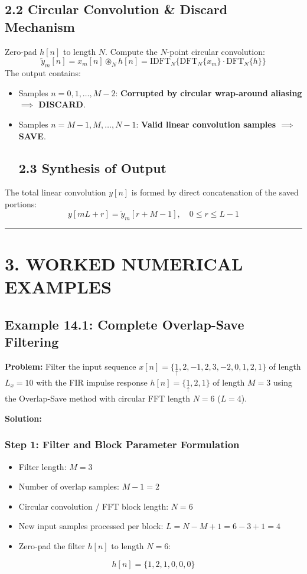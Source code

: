 \documentclass[11pt,a4paper]{article}
\begin{document}
\subsection*{2.2 Circular Convolution \& Discard Mechanism}
Zero-pad $h[n]$ to length $N$. Compute the $N$-point circular convolution:
$$ \tilde{y}_m[n] = x_m[n] \circledast_N h[n] = \text{IDFT}_N\{\text{DFT}_N\{x_m\} \cdot \text{DFT}_N\{h\}\} $$
The output contains:
\begin{itemize}
\item Samples $n = 0, 1, \dots, M-2$: \textbf{Corrupted by circular wrap-around aliasing $\implies$ DISCARD}.
\item Samples $n = M-1, M, \dots, N-1$: \textbf{Valid linear convolution samples $\implies$ SAVE}.

\subsection*{2.3 Synthesis of Output}
\end{itemize}
The total linear convolution $y[n]$ is formed by direct concatenation of the saved portions:
$$ y[mL + r] = \tilde{y}_m[r + M - 1], \quad 0 \le r \le L-1 $$

\noindent\rule{\textwidth}{0.5pt}
\section*{3. WORKED NUMERICAL EXAMPLES}

\subsection*{Example 14.1: Complete Overlap-Save Filtering}
\textbf{Problem:} Filter the input sequence $x[n] = \{ \underset{\uparrow}{1}, 2, -1, 2, 3, -2, 0, 1, 2, 1 \}$ of length $L_x = 10$ with the FIR impulse response $h[n] = \{ \underset{\uparrow}{1}, 2, 1 \}$ of length $M = 3$ using the Overlap-Save method with circular FFT length $N = 6$ ($L = 4$).

\textbf{Solution:}

\subsubsection*{Step 1: Filter and Block Parameter Formulation}
\begin{itemize}
\item Filter length: $M = 3$
\item Number of overlap samples: $M - 1 = 2$
\item Circular convolution / FFT block length: $N = 6$
\item New input samples processed per block: $L = N - M + 1 = 6 - 3 + 1 = 4$
\item Zero-pad the filter $h[n]$ to length $N = 6$:
\end{itemize}
  $$ h[n] = \{ 1, 2, 1, 0, 0, 0 \} $$
\end{document}
